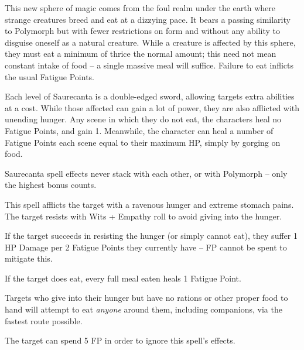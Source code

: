 
\begin{multicols}{2}

\noindent
This new sphere of magic comes from the foul realm under the earth where strange creatures breed and eat at a dizzying pace.
It bears a passing similarity to Polymorph but with fewer restrictions on form and without any ability to disguise oneself as a natural creature.
While a creature is affected by this sphere, they must eat a minimum of thrice the normal amount; this need not mean constant intake of food -- a single massive meal will suffice.
Failure to eat inflicts the usual Fatigue Points.

Each level of Saurecanta is a double-edged sword, allowing targets extra abilities at a cost.
While those affected can gain a lot of power, they are also afflicted with unending hunger.
Any scene in which they do not eat, the characters heal no Fatigue Points, and gain 1.
Meanwhile, the character can heal a number of Fatigue Points each scene equal to their maximum HP, simply by gorging on food.

Saurecanta spell effects never stack with each other, or with Polymorph -- only the highest bonus counts.

\spelllevel \label{saurecantaone}


This spell afflicts the target with a ravenous hunger and extreme stomach pains.
The target resists with Wits + Empathy roll to avoid giving into the hunger.

If the target succeeds in resisting the hunger (or simply cannot eat), they suffer 1 HP Damage per 2 Fatigue Points they currently have -- FP cannot be spent to mitigate this.

If the target does eat, every full meal eaten heals 1 Fatigue Point.

Targets who give into their hunger but have no rations or other proper food to hand will attempt to eat \emph{anyone} around them, including companions, via the fastest route possible.

The target can spend 5 FP in order to ignore this spell's effects.

\spelllevel



\end{multicols}
